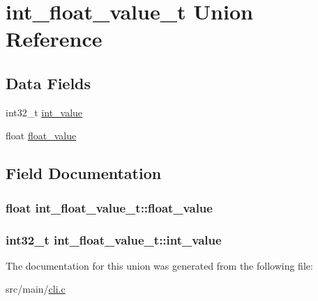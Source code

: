 \hypertarget{unionint__float__value__t}{\section{int\+\_\+float\+\_\+value\+\_\+t Union Reference}
\label{unionint__float__value__t}
}
\subsection*{Data Fields}
\begin{DoxyCompactItemize}
\item 
int32\+\_\+t \hyperlink{unionint__float__value__t_ab73b27ef8c42c30c64032d1a99a14480}{int\+\_\+value}
\item 
float \hyperlink{unionint__float__value__t_ab60336b122031a81564cd713fac9d4d6}{float\+\_\+value}
\end{DoxyCompactItemize}


\subsection{Field Documentation}
\hypertarget{unionint__float__value__t_ab60336b122031a81564cd713fac9d4d6}{
\subsubsection[{float\+\_\+value}]{\setlength{\rightskip}{0pt plus 5cm}float int\+\_\+float\+\_\+value\+\_\+t\+::float\+\_\+value}}\label{unionint__float__value__t_ab60336b122031a81564cd713fac9d4d6}
\hypertarget{unionint__float__value__t_ab73b27ef8c42c30c64032d1a99a14480}{
\subsubsection[{int\+\_\+value}]{\setlength{\rightskip}{0pt plus 5cm}int32\+\_\+t int\+\_\+float\+\_\+value\+\_\+t\+::int\+\_\+value}}\label{unionint__float__value__t_ab73b27ef8c42c30c64032d1a99a14480}


The documentation for this union was generated from the following file\+:\begin{DoxyCompactItemize}
\item 
src/main/\hyperlink{cli_8c}{cli.\+c}\end{DoxyCompactItemize}
